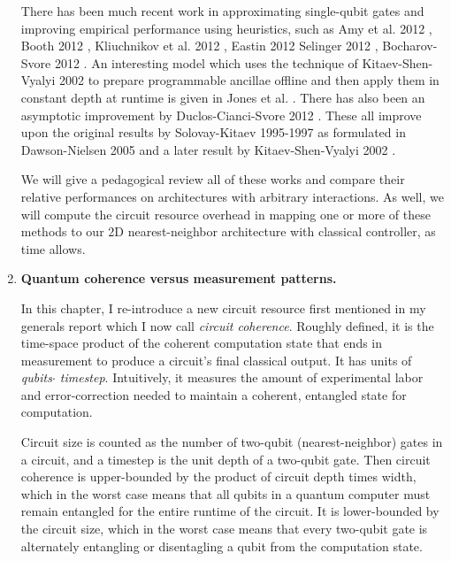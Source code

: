 \documentclass[]{article}
\theoremstyle{plain} \newtheorem{lemma}{Lemma}
\begin{document}
\begin{enumerate}
There has been much recent
work in approximating single-qubit gates and improving empirical performance
using heuristics, such as 
Amy et al. 2012 \cite{Amy2012}, Booth 2012 \cite{Booth2012},
Kliuchnikov et al. 2012 \cite{Kliuchnikov2012a},
Eastin 2012 \cite{Eastin2012}
Selinger 2012 \cite{Selinger2012}, Bocharov-Svore 2012 \cite{Bocharov2012}.
An interesting model which uses the technique of Kitaev-Shen-Vyalyi 2002
\cite{Kitaev2002} to prepare programmable ancillae offline and then apply them
in constant depth at runtime is given in Jones et al. \cite{Jones2012}.
There has also been an asymptotic improvement by Duclos-Cianci-Svore 2012 \cite{Duclos-Cianci2012}.
These all improve upon the original results by Solovay-Kitaev 1995-1997 as
formulated in Dawson-Nielsen 2005 \cite{Dawson2005} and a later result by
Kitaev-Shen-Vyalyi 2002 \cite{Kitaev2002}.

We will give a pedagogical
review all of these works and compare their relative performances on
architectures with arbitrary interactions. As well, we will
compute the circuit resource overhead in mapping one or more of these
methods to our 2D nearest-neighbor architecture with classical controller,
as time allows.


\item
\textbf{Quantum coherence versus measurement patterns.}

In this chapter, I re-introduce 
a new circuit resource first mentioned in my generals report
which I now call \emph{circuit coherence}. Roughly defined,
it is the time-space product of the coherent computation
state that ends in measurement to produce a circuit's final classical output.
It has units of \emph{qubits$\cdot$ timestep}. Intuitively, it measures the
amount of experimental labor and error-correction needed to maintain a
coherent, entangled state for computation.

Circuit size is counted as the
number of two-qubit (nearest-neighbor) gates in a circuit, and a timestep is
the unit depth of a two-qubit gate. Then circuit coherence is upper-bounded by the
product of circuit depth times width, which in the worst case means that
all qubits in a quantum computer must remain entangled for the entire
runtime of the circuit. It is lower-bounded by the circuit size, which in
the worst case means that every two-qubit gate is alternately entangling
or disentagling a qubit from the computation state.


\end{enumerate}
\end{document}

